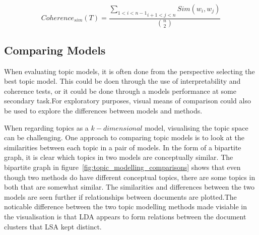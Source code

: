 \documentclass[10pt]{report}
\begin{document}

\[
  Coherence_{sim}(T)=\frac{\underset{i+1<j<n}{\underset{1<i<n-1}{\sum}}Sim(w_i, w_j)}{{n \choose 2}}
\]
 
%


\subsection{Comparing Models}
When evaluating topic models, it is often done from the perspective selecting the best topic model. This could be doen through the use of interpretability and coherence tests, or it could be done through a models performance at some secondary task.For exploratory purposes, visual means of comparison could also be used to explore the differences between models and methods.

When regarding topics as a \(k-dimensional\) model, visualising the topic space can be challenging. One approach to comparing topic models is to look at the similarities between each topic in a pair of models. In the form of a bipartite graph, it is clear which topics in two models are conceptually similar. The bipartite graph in figure~\ref{fig:topic_modelling_comparisons} shows that even though two methods do have different conceptual topics, there are some topics in both that are somewhat similar. The similarities and differences between the two models are seen further if relationships between documents are plotted.The noticable difference between the two topic modelling methods made visiable in the visualisation is that LDA appears to form relations between the document clusters that LSA kept distinct.~\cite{Crossno2011-sn}
\end{document}
